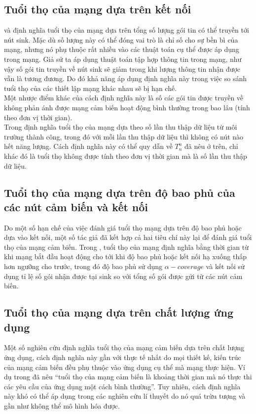 \subsection{Tuổi thọ của mạng dựa trên kết nối }
\cite{Baydere2005} và \cite{Yu2001} định nghĩa tuổi thọ của mạng dựa trên tổng số lượng gói tin có thể truyền tới nút sink. Mặc dù số lượng này có thể đóng vai trò là chỉ số cho sự bền bì của mạng, nhưng nó phụ thuộc rất nhiều vào các thuật toán cụ thể được áp dụng trong mạng. Giả sử ta áp dụng thuật toán tập hợp thông tin trong mạng, như vậy số gói tin truyền về nút sink sẽ giảm trong khi lượng thông tin nhận được vẫn là tương đương. Do đó khả năng áp dụng định nghĩa này trong việc so sánh tuổi thọ của các thiết lập mạng khác nhau sẽ bị hạn chế.
\\Một nhược điểm khác của cách định nghĩa này là số các gói tin được truyền về không phản ánh được mạng cảm biến hoạt động bình thường trong bao lâu (tính theo đơn vị thời gian).
\\Trong \cite{Giridhar} định nghĩa tuổi thọ của mạng dựa theo số lần thu thập dữ liệu từ môi trường thành công, trong đó với mỗi lần thu thập dữ liệu thì không có nút nào hết năng lượng. Cách định nghĩa này có thể quy dẫn về $T_n^n$ đã nêu ở trên, chỉ khác đó là tuổi thọ không được tính theo đơn vị thời gian mà là số lần thu thập dữ liệu.
\subsection{Tuổi thọ của mạng dựa trên độ bao phủ của các nút cảm biến và kết nối}
Do một số hạn chế của việc đánh giá tuổi thọ mạng dựa trên độ bao phủ hoặc dựa vào kết nối, một số tác giả đã kết hợp cả hai tiêu chí này lại để đánh giá tuổi thọ của mạng cảm biến. Trong \cite{Wang2003}, tuổi thọ của mạng định nghĩa bằng thời gian từ khi mạng bắt đầu hoạt động cho tới khi độ bao phủ hoặc kết nối hạ xuống thấp hơn ngưỡng cho trước, trong đó độ bao phủ sử dụng $\alpha-coverage$ và kết nối sử dụng tỉ lệ số gói nhận được tại sink so với tổng số gói được gửi từ các nút cảm biến.
\subsection{Tuổi thọ của mạng dựa trên chất lượng ứng dụng}
Một số nghiên cứu định nghĩa tuổi thọ của mạng cảm biến dựa trên chất lượng ứng dụng, cách định nghĩa này gần với thực tế nhất do mọi thiết kế, kiến trúc của mạng cảm biến đều phụ thuộc vào ứng dụng cụ thể mà mạng thực hiện. Ví dụ trong \cite{Giridhar} đã nêu ``tuổi thọ của mạng cảm biến là khoảng thời gian mà nó thực thi các yêu cầu của ứng dụng một cách bình thường''. Tuy nhiên, cách định nghĩa này khó có thể áp dụng trong các nghiên cứu lí thuyết do nó quá trừu tượng và gần như không thể mô hình hóa được.
